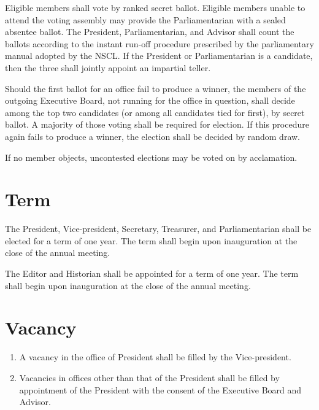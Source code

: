\documentclass{bylaws}
\newcommand{\NSCL}{\textsc{NSCL}\xspace}
\begin{document}
\begin{linenumbers}[1]
\begin{enumerate}
    \sub[Voting] Eligible members shall vote by ranked secret
    ballot. Eligible members unable to attend the voting assembly may
    provide the Parliamentarian with a sealed absentee ballot. The
    President, Parliamentarian, and Advisor shall count the ballots
    according to the instant run-off procedure prescribed by the
    parliamentary manual adopted by the \NSCL. If the President or
    Parliamentarian is a candidate, then the three shall jointly appoint
    an impartial teller.
    
    \sub[No Election] Should the first ballot for an office fail to
    produce a winner, the members of the outgoing Executive Board, not
    running for the office in question, shall decide among the top two
    candidates (or among all candidates tied for first), by secret
    ballot. A majority of those voting shall be required for
    election. If this procedure again fails to produce a winner, the
    election shall be decided by random draw.
    
     If no member objects, uncontested
    elections may be voted on by acclamation.\\
  \end{enumerate}

  \section{Term}
  \begin{enumerate}
     The President, Vice-president, Secretary,
    Treasurer, and Parliamentarian shall be elected for a term of one
    year. The term shall begin upon inauguration at the close of the
    annual meeting.
    
     The Editor and Historian shall be
    appointed for a term of one year. The term shall begin upon
    inauguration at the close of the annual meeting.\\
  \end{enumerate}

  \section{Vacancy}
  \begin{enumerate}
  \item A vacancy in the office of President shall be filled by the
    Vice-president.
  \item Vacancies in offices other than that of the President shall be
    filled by appointment of the President with the consent of the
    Executive Board and Advisor.\\
  \end{enumerate}


\end{linenumbers}
\end{document}
